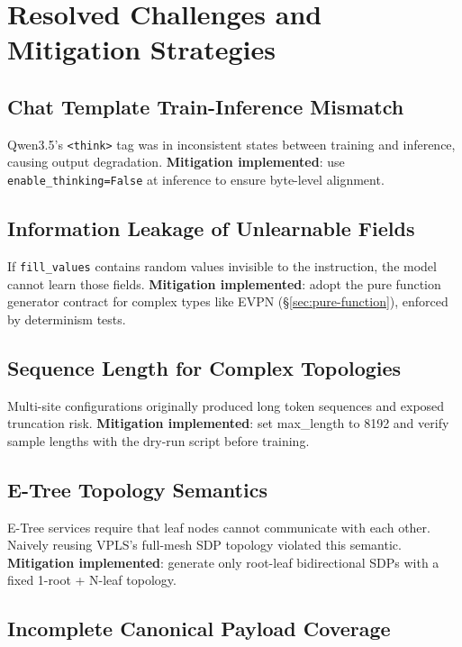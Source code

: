 \documentclass[12pt, a4paper]{article}
\newcommand{\fillvalues}{\texttt{fill\_values}}
\begin{document}
\section{Resolved Challenges and Mitigation Strategies}
\label{sec:challenges}

\subsection{Chat Template Train-Inference Mismatch}

Qwen3.5's \texttt{<think>} tag was in inconsistent states between training and inference, causing output degradation. \textbf{Mitigation implemented}: use \texttt{enable\_thinking=False} at inference to ensure byte-level alignment.

\subsection{Information Leakage of Unlearnable Fields}

If \fillvalues{} contains random values invisible to the instruction, the model cannot learn those fields. \textbf{Mitigation implemented}: adopt the pure function generator contract for complex types like EVPN (\S\ref{sec:pure-function}), enforced by determinism tests.

\subsection{Sequence Length for Complex Topologies}

Multi-site configurations originally produced long token sequences and exposed truncation risk. \textbf{Mitigation implemented}: set max\_length to 8192 and verify sample lengths with the dry-run script before training.

\subsection{E-Tree Topology Semantics}

E-Tree services require that leaf nodes cannot communicate with each other. Naively reusing VPLS's full-mesh SDP topology violated this semantic. \textbf{Mitigation implemented}: generate only root-leaf bidirectional SDPs with a fixed 1-root + N-leaf topology.

\subsection{Incomplete Canonical Payload Coverage}
\end{document}
